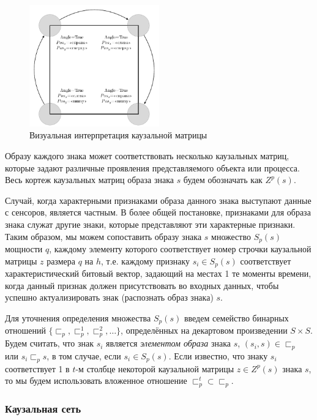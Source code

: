 \documentclass[12pt]{report}
\begin{document}
	\begin{figure}
		\label{fig:square}
		\centering
		\includegraphics[width=0.5\textwidth]{examples/recognition/square}
		\caption{Визуальная интерпретация каузальной матрицы}		
	\end{figure}
	
	Образу каждого знака может соответствовать несколько каузальных матриц, которые задают различные проявления представляемого объекта или процесса. Весь кортеж каузальных матриц образа знака $s$ будем обозначать как $Z^p(s)$. 
	
	Случай, когда характерными признаками образа данного знака выступают данные с сенсоров, является частным. В более общей постановке, признаками для образа знака служат другие знаки, которые представляют эти характерные признаки. Таким образом, мы можем сопоставить образу знака $s$ множество $S_p(s)$ мощности $q$, каждому элементу которого соответствует номер строчки каузальной матрицы $z$ размера $q$ на $h$, т.е. каждому признаку $s_i\in S_p(s)$ соответствует характеристический битовый вектор, задающий на местах 1 те моменты времени, когда данный признак должен присутствовать во входных данных, чтобы успешно актуализировать знак (распознать образ знака) $s$. 
	
	Для уточнения определения множества $S_p(s)$ введем семейство бинарных отношений $\{\sqsubset_p,\sqsubset_p^1,\sqsubset_p^2,\dots\}$, определённых на декартовом произведении $S\times S$. Будем считать, что знак $s_i$ является \textit{элементом образа} знака $s$, $(s_i,s)\in\sqsubset_p$ или $s_i\sqsubset_p s$, в том случае, если $s_i\in S_p(s)$. Если известно, что знаку $s_i$ соответствует 1 в $t$-м столбце некоторой каузальной матрицы $z\in Z^p(s)$ знака $s$, то мы будем использовать вложенное отношение $\sqsubset_p^t\subset \sqsubset_p$.
	
	\subsubsection{Каузальная сеть} \label{subsec:causal_net}
	
\end{document}
